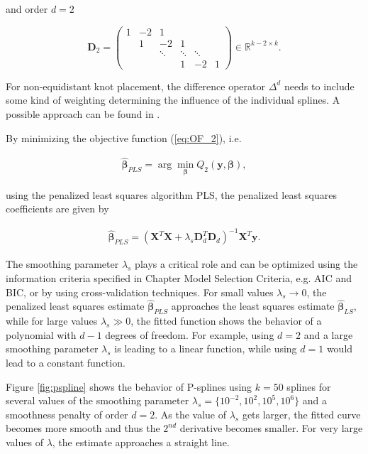 \documentclass[10pt,a4paper]{article}
\begin{document}
	and order $d=2$
	
	$$\boldsymbol{D}_2 = 
			\begin{pmatrix} 
				1& -2& 1& &    \\  
				 & 1 & -2 & 1& \\ 
				 &  & \ddots & \ddots  & \ddots \\ 
				 & & & 1 & -2 & 1 
			\end{pmatrix} \in \mathbb R^{k-2\times k}.$$
	
	For non-equidistant knot placement, the difference operator $\Delta^d$ needs to include some kind of weighting determining the influence of the individual splines. A possible approach can be found in \cite{ferziger2008numerische}.
	
	By minimizing the objective function (\ref{eq:OF_2}), i.e.
	
	\begin{align}\label{eq:optimization_problem_2}
		\boldsymbol{\hat \beta}_{PLS} = \arg \min_{\boldsymbol{\beta}} Q_2(\boldsymbol{y}, \boldsymbol{\beta}),
	\end{align}
	
	using the penalized least squares algorithm PLS, the penalized least squares coefficients are given by
	
	\begin{align} \label{eq:PLS_coef}
		\boldsymbol{\hat \beta}_{PLS}= (\boldsymbol{X}^T \boldsymbol{X} + \lambda_s \boldsymbol{D}_d^T \boldsymbol{D}_d)^{-1} \boldsymbol{X}^T \boldsymbol{y}.
	\end{align} 
	
	The smoothing parameter $\lambda_s$ plays a critical role and can be optimized using the information criteria specified in Chapter Model Selection Criteria, e.g. AIC and BIC, or by using cross-validation techniques. \cite{fahrmeir2013regression}
	For small values $\lambda_s \rightarrow 0$, the penalized least squares estimate $\boldsymbol{\hat{\beta}}_{PLS}$ approaches the least squares estimate $\boldsymbol{\hat{\beta}}_{LS}$, while for large values $\lambda_s \gg 0$, the fitted function shows the behavior of a polynomial with $d-1$ degrees of freedom. For example, using $d=2$ and a large smoothing parameter $\lambda_s$ is leading to a linear function, while using $d=1$ would lead to a constant function. \cite{fahrmeir2013regression}
	
	Figure \ref{fig:pspline} shows the behavior of P-splines using $k=50$ splines for several values of the smoothing parameter $\lambda_s = \{10^{-2}, 10^{2},10^{5},10^{6}\}$ and a smoothness penalty of order $d=2$.  As the value of $\lambda_s$ gets larger, the fitted curve becomes more smooth and thus the $2^{nd}$ derivative becomes smaller. For very large values of $\lambda$, the estimate approaches a straight line.
	
\end{document}
